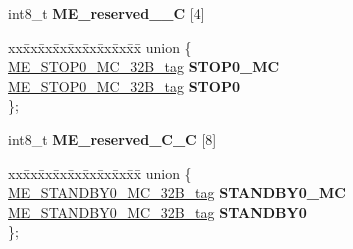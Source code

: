 \begin{DoxyCompactItemize}
\begin{tabbing}
\end{tabbing}\item 
\mbox{\label{structME__struct__tag_aab77c432af3ede245123eee58933384a}} 
int8\+\_\+t {\bfseries M\+E\+\_\+reserved\+\_\+\_\+C} \mbox{[}4\mbox{]}
\item 
\mbox{\label{structME__struct__tag_af26b9eadbdd59291be517064d276346b}} 
\begin{tabbing}
xx\=xx\=xx\=xx\=xx\=xx\=xx\=xx\=xx\=\kill
union \{\\
\>\mbox{\hyperlink{unionME__STOP0__MC__32B__tag}{ME\_STOP0\_MC\_32B\_tag}} {\bfseries STOP0\_MC}\\
\>\mbox{\hyperlink{unionME__STOP0__MC__32B__tag}{ME\_STOP0\_MC\_32B\_tag}} {\bfseries STOP0}\\
\}; \\

\end{tabbing}\item 
\mbox{\label{structME__struct__tag_aac5e5ce647eb1e714857222347852687}} 
int8\+\_\+t {\bfseries M\+E\+\_\+reserved\+\_\+C\+\_\+C} \mbox{[}8\mbox{]}
\item 
\mbox{\label{structME__struct__tag_a41f3f325a06e5b28b98d6495cc554c2d}} 
\begin{tabbing}
xx\=xx\=xx\=xx\=xx\=xx\=xx\=xx\=xx\=\kill
union \{\\
\>\mbox{\hyperlink{unionME__STANDBY0__MC__32B__tag}{ME\_STANDBY0\_MC\_32B\_tag}} {\bfseries STANDBY0\_MC}\\
\>\mbox{\hyperlink{unionME__STANDBY0__MC__32B__tag}{ME\_STANDBY0\_MC\_32B\_tag}} {\bfseries STANDBY0}\\
\}; \\


\end{tabbing}
\end{DoxyCompactItemize}

